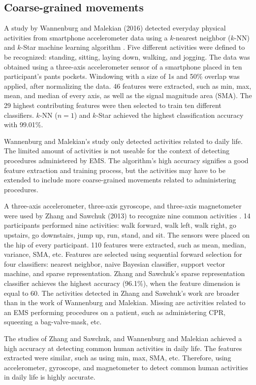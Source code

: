 \subsection{Coarse-grained movements}
A study by Wannenburg and Malekian (2016) detected everyday physical activities from smartphone accelerometer data using a $k$-nearest neighbor ($k$-NN) and $k$-Star machine learning algorithm \cite{Wannenburg2016}. Five different activities were defined to be recognized: standing, sitting, laying down, walking, and jogging. The data was obtained using a three-axis accelerometer sensor of a smartphone placed in ten participant's pants pockets. Windowing with a size of 1s and 50\% overlap was applied, after normalizing the data. 46 features were extracted, such as min, max, mean, and median of every axis, as well as the signal magnitude area (\gls{SMA}). The 29 highest contributing features were then selected to train ten different classifiers. $k$-NN ($n = 1$) and $k$-Star achieved the highest classification accuracy with 99.01\%.
\par Wannenburg and Malekian’s study only detected activities related to daily life. The limited amount of activities is not useable for the context of detecting procedures administered by EMS. The algorithm's high accuracy signifies a good feature extraction and training process, but the activities may have to be extended to include more coarse-grained movements related to administering procedures.
\par A three-axis accelerometer, three-axis gyroscope, and three-axis magnetometer were used by Zhang and Sawchuk (2013) to recognize nine common activities \cite{Zhang2013}. 14 participants performed nine activities: walk forward, walk left, walk right, go upstairs, go downstairs, jump up, run, stand, and sit. The sensors were placed on the hip of every participant. 110 features were extracted, such as mean, median, variance, SMA, etc. Features are selected using sequential forward selection for four classifiers: nearest neighbor, naive Bayesian classifier, support vector machine, and sparse representation. Zhang and Sawchuk's sparse representation classifier achieves the highest accuracy (96.1\%), when the feature dimension is equal to 60. The activities detected in Zhang and Sawchuk's work are broader than in the work of Wannenburg and Malekian. Missing are activities related to an EMS performing procedures on a patient, such as administering CPR, squeezing a bag-valve-mask, etc.
\par The studies of Zhang and Sawchuk, and Wannenburg and Malekian achieved a high accuracy at detecting common human activities in daily life. The features extracted were similar, such as using min, max, SMA, etc. Therefore, using accelerometer, gyroscope, and magnetometer to detect common human activities in daily life is highly accurate.
